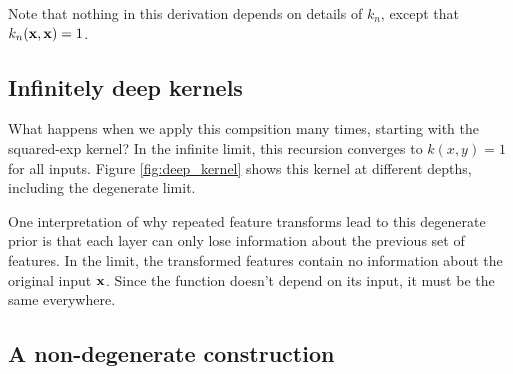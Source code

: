 \documentclass{article}
\begin{document}
%
%
Note that nothing in this derivation depends on details of $k_n$, except that $k_n( {\bf{x}}, {\bf{x}}) = 1$.

\subsection{Infinitely deep kernels}
What happens when we apply this compsition many times, starting with the squared-exp kernel?  In the infinite limit, this recursion converges to $k(x,y) = 1$ for all inputs.  Figure \ref{fig:deep_kernel} shows this kernel at different depths, including the degenerate limit.  

One interpretation of why repeated feature transforms lead to this degenerate prior is that each layer can only lose information about the previous set of features.  In the limit, the transformed features contain no information about the original input ${\bf{x}}$.  Since the function doesn't depend on its input, it must be the same everywhere.

\subsection{A non-degenerate construction}
\end{document}
